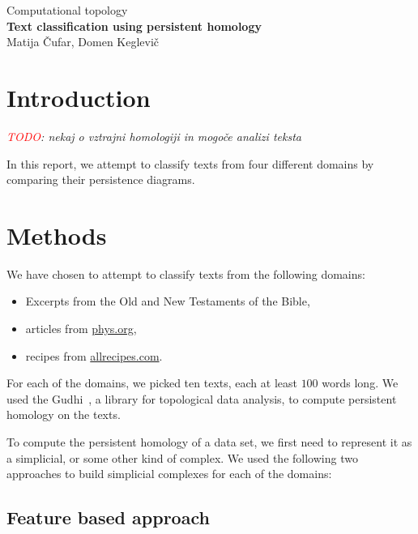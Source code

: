 \documentclass[12pt,a4paper]{amsart}
\begin{document}
\thispagestyle{empty}
\begin{center}{\large
Computational topology\\[4mm]
{\bf Text classification using persistent homology}\\[4mm]
Matija Čufar, Domen Keglevič\\[6mm]
}
\end{center}
\bigskip

\section{Introduction}

\emph{\textcolor{red}{TODO}: nekaj o vztrajni homologiji in mogoče analizi teksta}

In this report, we attempt to classify texts from four different domains by
comparing their persistence diagrams.

\section{Methods}

We have chosen to attempt to classify texts from the following domains:

\begin{itemize}
  \setlength\itemsep{0.5em}
\item Excerpts from the Old and New Testaments of the Bible,
\item articles from \url{phys.org},
\item recipes from \url{allrecipes.com}.
\end{itemize}


For each of the domains, we picked ten texts, each at least $100$ words long. We
used the Gudhi~\cite{maria2014gudhi}, a library for topological data analysis,
to compute persistent homology on the texts.

To compute the persistent homology of a data set, we first need to represent it
as a simplicial, or some other kind of complex. We used the following two
approaches to build simplicial complexes for each of the domains:

\subsection{Feature based approach}
\end{document}
